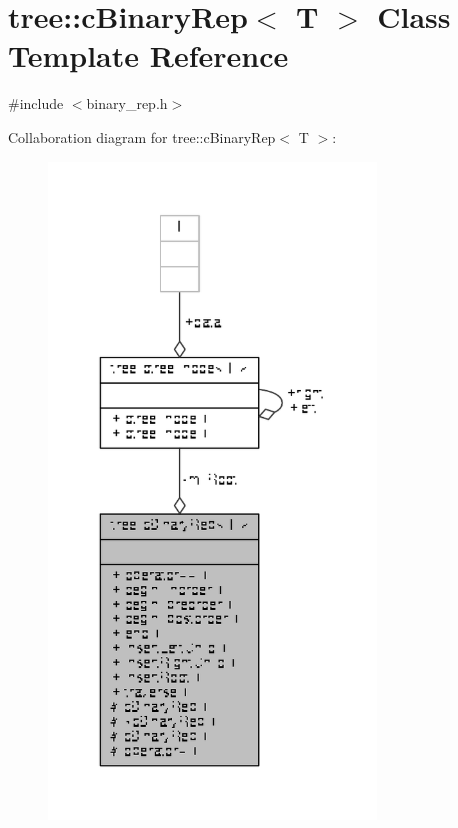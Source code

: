 \hypertarget{classtree_1_1cBinaryRep}{\section{tree\-:\-:c\-Binary\-Rep$<$ T $>$ Class Template Reference}
\label{classtree_1_1cBinaryRep}
}


{\ttfamily \#include $<$binary\-\_\-rep.\-h$>$}



Collaboration diagram for tree\-:\-:c\-Binary\-Rep$<$ T $>$\-:
\nopagebreak
\begin{figure}[H]
\begin{center}
\leavevmode
\includegraphics[width=247pt]{classtree_1_1cBinaryRep__coll__graph}
\end{center}
\end{figure}
